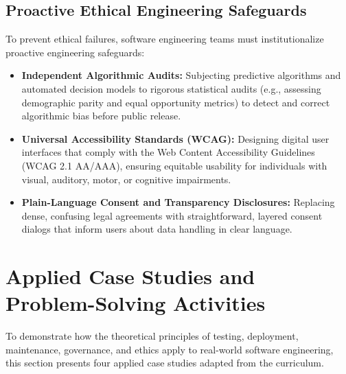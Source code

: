 \documentclass[11pt,a4paper]{article}
\begin{document}
\subsection{Proactive Ethical Engineering Safeguards}
To prevent ethical failures, software engineering teams must institutionalize proactive engineering safeguards:
\begin{itemize}
    \item \textbf{Independent Algorithmic Audits:} Subjecting predictive algorithms and automated decision models to rigorous statistical audits (e.g., assessing demographic parity and equal opportunity metrics) to detect and correct algorithmic bias before public release.
    \item \textbf{Universal Accessibility Standards (WCAG):} Designing digital user interfaces that comply with the Web Content Accessibility Guidelines (WCAG 2.1 AA/AAA), ensuring equitable usability for individuals with visual, auditory, motor, or cognitive impairments.
    \item \textbf{Plain-Language Consent and Transparency Disclosures:} Replacing dense, confusing legal agreements with straightforward, layered consent dialogs that inform users about data handling in clear language.
\end{itemize}

\section{Applied Case Studies and Problem-Solving Activities}
\label{sec:case_studies}

To demonstrate how the theoretical principles of testing, deployment, maintenance, governance, and ethics apply to real-world software engineering, this section presents four applied case studies adapted from the curriculum.
\end{document}
